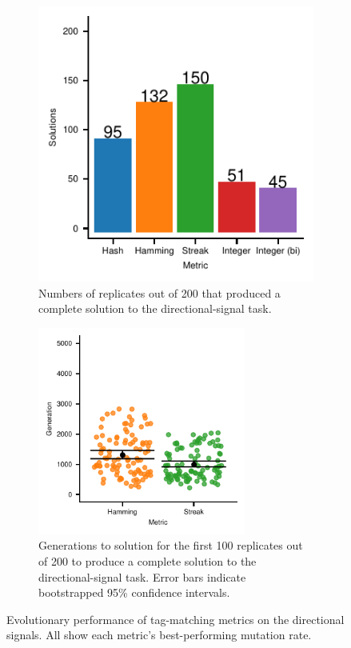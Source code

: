 \begin{figure}[!htbp]

\begin{subfigure}[b]{\linewidth}
\centering
\includegraphics[width=0.75\linewidth]{img/gp_results/panel-dst-sols.pdf}%
\caption{
Numbers of replicates out of 200 that produced a complete solution to the directional-signal task.}
\label{fig:dst-sols}
\end{subfigure}
\begin{subfigure}[b]{\linewidth}
\centering
\includegraphics[width=0.75\textwidth]{img/gp_results/panel-dst-times.pdf}%
\caption{
Generations to solution for the first 100 replicates out of 200 to produce a complete solution to the directional-signal task.
Error bars indicate bootstrapped 95\% confidence intervals.
}
\label{fig:dst-times}
\end{subfigure}

\label{fig:gp_results}

\caption{
Evolutionary performance of tag-matching metrics on the directional signals.
All show each metric's best-performing mutation rate.
}

\label{fig:evo_directional_signal}
\end{figure}
